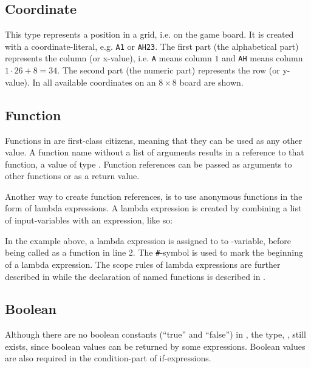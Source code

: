 

\subsection{Coordinate}
\label{sec:coordinatetype}

This type represents a position in a grid, i.e. on the game board. It is created with
a coordinate-literal, e.g. \texttt{A1} or \texttt{AH23}. The first part (the alphabetical part)
represents the column (or x-value), i.e. \texttt{A} means column $1$ and \texttt{AH} means
column $1 \cdot 26 + 8 = 34$. The second part (the numeric part) represents the row (or y-value).
In  all available coordinates on an $8 \times 8 $ board are shown.


\subsection{Function}
\label{sec:functiontype}
Functions in \productname{} are first-class citizens, meaning that they can be used as any
other value. A function name without a list of arguments results in a reference to that
function, a value of type . Function references can be passed as arguments 
to other functions or as a return value.

Another way to create function references, is to use anonymous functions in the form
of lambda expressions. A lambda expression is created by combining a list of input-variables
with an expression, like so:


In the example above, a lambda expression is assigned to to -variable, before
being called as a function in line 2. The \texttt{\#}-symbol is used to mark the beginning
of a lambda expression. The scope rules of lambda expressions are further described in 
while the declaration of named functions is described in .

\subsection{Boolean}
Although there are no boolean constants (``true'' and ``false'') in \productname,
the type, , still exists, since boolean values can be returned by
some expressions. Boolean values are also required in the condition-part of
if-expressions.


